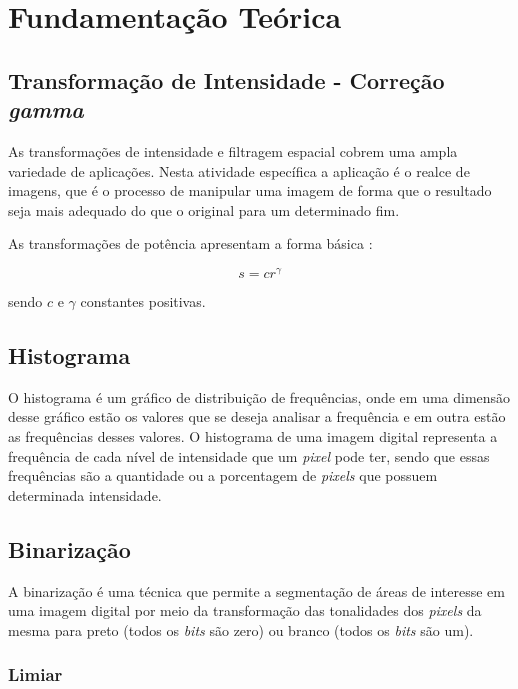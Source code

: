 \chapter[Fundamentação Teórica]{Fundamentação Teórica}

\section{Transformação de Intensidade - Correção \textit{gamma}}

As transformações de intensidade e filtragem espacial cobrem uma ampla variedade de aplicações. Nesta atividade específica a aplicação é o realce de imagens, que é o processo de manipular uma imagem de forma que o resultado seja mais adequado do que o original para um determinado fim.

As transformações de potência apresentam a forma básica \cite{gonzalez2009processamento}:

\begin{equation}\label{eq:gamma}
    s = cr^\gamma
\end{equation}

sendo $c$ e $\gamma$ constantes positivas.

\section{Histograma}

O histograma é um gráfico de distribuição de frequências, onde em uma dimensão desse gráfico estão os valores que se deseja analisar a frequência e em outra estão as frequências desses valores. O histograma de uma imagem digital representa a frequência de cada nível de intensidade que um \textit{pixel} pode ter, sendo que essas frequências são a quantidade ou a porcentagem de \textit{pixels} que possuem determinada intensidade.

\section{Binarização}

A binarização é uma técnica que permite a segmentação de áreas de interesse em uma imagem digital por meio da transformação das tonalidades dos \textit{pixels} da mesma para preto (todos os \textit{bits} são zero) ou branco (todos os \textit{bits} são um).

\subsection{Limiar}

